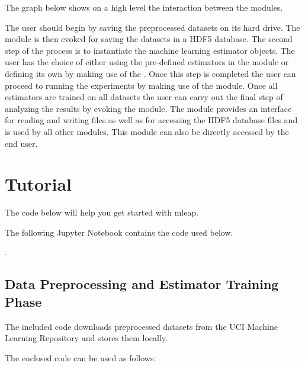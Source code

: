 \documentclass[letterpaper,10pt,english]{sphinxmanual}
\begin{document}
The graph below shows on a high level the interaction between the modules.

\begin{figure}[htbp]
\centering

\noindent{}
\end{figure}

The user should begin by saving the preprocessed datasets on its hard drive. The  module is then evoked for saving the datasets in a HDF5 database. The second step of the process is to instantiate the machine learning estimator objects. The user has the choice of either using the pre-defined estimators in the  module or defining its own by making use of the {\hyperref[\detokenize{estimators:mleap-estimator-label}]{}}. Once this step is completed the user can proceed to running the experiments by making use of the  module. Once all estimators are trained on all datasets the user can carry out the final step of analyzing the results by evoking the  module. The  module provides an interface for reading and writing files as well as for accessing the HDF5 database files and is used by all other modules. This module can also be directly accessed by the end user.


\chapter{Tutorial}
\label{\detokenize{tutorial:tutorial}}\label{\detokenize{tutorial::doc}}
The code below will help you get started with mleap.

The following Jupyter Notebook contains the code used below.

.


\section{Data Preprocessing and Estimator Training Phase}
\label{\detokenize{tutorial:data-preprocessing-and-estimator-training-phase}}

The included code downloads preprocessed datasets from the UCI Machine Learning Repository and stores them locally.


The enclosed code can be used as follows:
\end{document}
